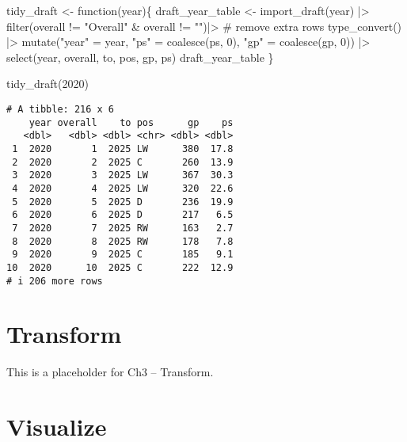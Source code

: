 \documentclass[
  letterpaper,
  DIV=11,
  numbers=noendperiod]{scrreprt}
\newenvironment{Shaded}{\begin{snugshade}}{\end{snugshade}}
\newcommand{\CommentTok}[1]{\textcolor[rgb]{0.37,0.37,0.37}{#1}}
\newcommand{\ControlFlowTok}[1]{\textcolor[rgb]{0.00,0.23,0.31}{#1}}
\newcommand{\DecValTok}[1]{\textcolor[rgb]{0.68,0.00,0.00}{#1}}
\newcommand{\FunctionTok}[1]{\textcolor[rgb]{0.28,0.35,0.67}{#1}}
\newcommand{\NormalTok}[1]{\textcolor[rgb]{0.00,0.23,0.31}{#1}}
\newcommand{\OtherTok}[1]{\textcolor[rgb]{0.00,0.23,0.31}{#1}}
\newcommand{\SpecialCharTok}[1]{\textcolor[rgb]{0.37,0.37,0.37}{#1}}
\newcommand{\StringTok}[1]{\textcolor[rgb]{0.13,0.47,0.30}{#1}}
\begin{document}
\begin{Shaded}
\begin{Highlighting}[]
\NormalTok{tidy\_draft }\OtherTok{\textless{}{-}} \ControlFlowTok{function}\NormalTok{(year)\{}
\NormalTok{  draft\_year\_table }\OtherTok{\textless{}{-}} \FunctionTok{import\_draft}\NormalTok{(year) }\SpecialCharTok{|\textgreater{}} 
    \FunctionTok{filter}\NormalTok{(overall }\SpecialCharTok{!=} \StringTok{"Overall"} \SpecialCharTok{\&}\NormalTok{ overall }\SpecialCharTok{!=} \StringTok{""}\NormalTok{)}\SpecialCharTok{|\textgreater{}} \CommentTok{\# remove extra rows}
    \FunctionTok{type\_convert}\NormalTok{() }\SpecialCharTok{|\textgreater{}} 
    \FunctionTok{mutate}\NormalTok{(}\StringTok{"year"} \OtherTok{=}\NormalTok{ year, }\StringTok{"ps"} \OtherTok{=} \FunctionTok{coalesce}\NormalTok{(ps, }\DecValTok{0}\NormalTok{), }\StringTok{"gp"} \OtherTok{=} \FunctionTok{coalesce}\NormalTok{(gp, }\DecValTok{0}\NormalTok{)) }\SpecialCharTok{|\textgreater{}} 
    \FunctionTok{select}\NormalTok{(year, overall, to, pos, gp, ps)}
\NormalTok{  draft\_year\_table}
\NormalTok{\}}

\FunctionTok{tidy\_draft}\NormalTok{(}\DecValTok{2020}\NormalTok{)}
\end{Highlighting}
\end{Shaded}

\begin{verbatim}
# A tibble: 216 x 6
    year overall    to pos      gp    ps
   <dbl>   <dbl> <dbl> <chr> <dbl> <dbl>
 1  2020       1  2025 LW      380  17.8
 2  2020       2  2025 C       260  13.9
 3  2020       3  2025 LW      367  30.3
 4  2020       4  2025 LW      320  22.6
 5  2020       5  2025 D       236  19.9
 6  2020       6  2025 D       217   6.5
 7  2020       7  2025 RW      163   2.7
 8  2020       8  2025 RW      178   7.8
 9  2020       9  2025 C       185   9.1
10  2020      10  2025 C       222  12.9
# i 206 more rows
\end{verbatim}


\chapter{Transform}\label{transform}

This is a placeholder for Ch3 -- Transform.


\chapter{Visualize}\label{visualize}
\end{document}
